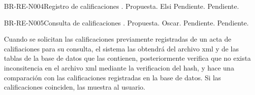 \begin{BusinessRule}{BR-RE-N004}{Registro de calificaciones}%
%	
	{\bcDerivation}%
	{\btTimer}%
	{\blControlling}%
	.
	\BRItem[Estado] Propuesta.
	 Elsi
	 Pendiente.
	 Pendiente.
	\BRItem[Descripción] 
	  	
	
	
\end{BusinessRule}
\begin{BusinessRule}{BR-RE-N005}{Consulta de calificaciones}%
%	
	{\bcCondition}%
	{\btExecutive}%
	{\blControlling}%
	.
	\BRItem[Estado] Propuesta.
	 Oscar.
	 Pendiente.
	 Pendiente.
	\BRItem[Descripción] 
	
	Cuando se solicitan las calificaciones previamente registradas de un acta de califiaciones para su consulta, el sistema las obtendrá del archivo xml y de las tablas de la base de datos que las contienen, posteriormente verifica que no exista inconsitencia en el archivo xml mediante la verificacion del hash, y hace una comparación con las calificaciones registradas en la base de datos. Si las calificaciones coinciden, las muestra al usuario. 
	
	
\end{BusinessRule}

